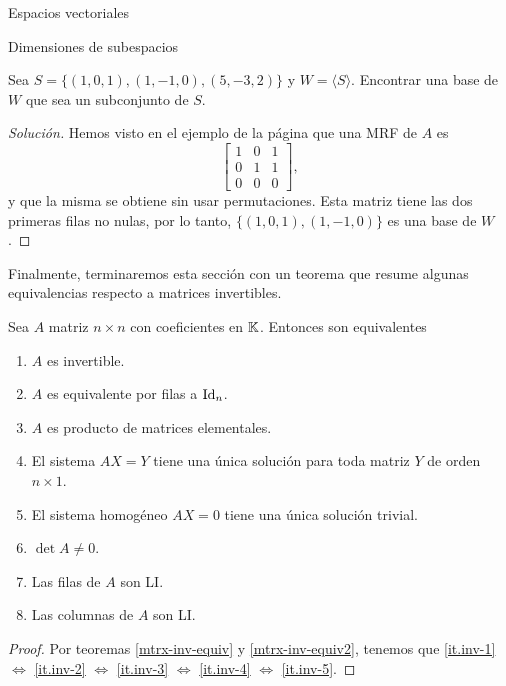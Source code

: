 \begin{chapter}{Espacios vectoriales}
\begin{section}{Dimensiones de subespacios}
    \begin{ejemplo*}
        Sea $S = \{(1,0,1),(1,-1,0), (5,-3,2)\}$ y $W = \langle S\rangle$. Encontrar una base de $W$ que sea un subconjunto de $S$. 
    \end{ejemplo*}
    \begin{proof}[Solución] Hemos visto en el ejemplo de la página \pageref{ej-4.5} que una  MRF de $A$  es 
        \begin{equation*}
            \begin{bmatrix} 1&0&1\\0&1&1\\0&0&0 \end{bmatrix},
        \end{equation*}
        y que la misma se obtiene sin usar permutaciones. Esta matriz tiene las dos primeras filas no nulas, por lo tanto, $\{(1,0,1),(1,-1,0)\}$ es una base de $W$.
    \end{proof}

Finalmente, terminaremos esta sección con un teorema que resume algunas equivalencias respecto a matrices invertibles.

\begin{teorema}
    Sea $A$ matriz $n \times n$ con coeficientes en $\mathbb K$. Entonces son equivalentes
    \begin{enumerate} 
        \item\label{it.inv-1} $A$ es invertible.
        \item\label{it.inv-2} $A$  es equivalente por filas a $\operatorname{Id}_n$.
        \item\label{it.inv-3} $A$ es producto de matrices elementales.
        \item\label{it.inv-4} El sistema $AX=Y$ tiene una única solución para toda matriz $Y$ de orden $n \times 1$. 
        \item\label{it.inv-5} El sistema homogéneo $AX=0$ tiene una única solución trivial.
        \item\label{it.inv-6} $\det A \ne 0$.
        \item\label{it.inv-7} Las filas de $A$ son LI.
        \item\label{it.inv-8} Las columnas de $A$ son LI.
    \end{enumerate}
\end{teorema}
\begin{proof} Por teoremas \ref{mtrx-inv-equiv} y  \ref{mtrx-inv-equiv2}, tenemos que 	\ref{it.inv-1}$\Leftrightarrow$ 	\ref{it.inv-2} $\Leftrightarrow$ 	\ref{it.inv-3} $\Leftrightarrow$ 	\ref{it.inv-4} $\Leftrightarrow$ 	\ref{it.inv-5}.
    

\end{proof}
\end{section}
\end{chapter}
